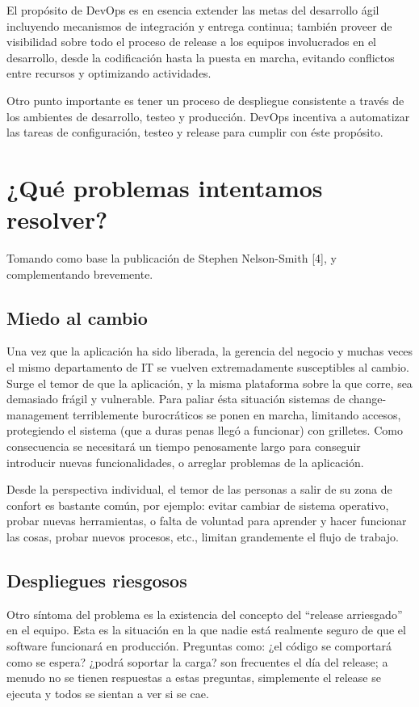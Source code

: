 \documentclass[conference]{IEEEtran}
\begin{document}
El propósito de DevOps es en esencia extender las metas del desarrollo ágil incluyendo mecanismos de integración y entrega continua; también proveer de visibilidad sobre todo el proceso de release a los equipos involucrados en el desarrollo, desde la codificación hasta la puesta en marcha, evitando conflictos entre recursos y optimizando actividades. 

Otro punto importante es tener un proceso de despliegue consistente a través de los ambientes de desarrollo, testeo y producción. DevOps incentiva a automatizar las tareas de configuración, testeo y release para cumplir con éste propósito.

\section{¿Qué problemas intentamos resolver?}
Tomando como base la publicación de Stephen Nelson-Smith [4], y complementando brevemente.

\subsection{Miedo al cambio}

Una vez que la aplicación ha sido liberada, la gerencia del negocio y muchas veces el mismo departamento de IT se vuelven extremadamente susceptibles al cambio. Surge el temor de que la aplicación, y la misma plataforma sobre la que corre, sea demasiado frágil y vulnerable. Para paliar ésta situación sistemas de change-management terriblemente burocráticos se ponen en marcha, limitando accesos, protegiendo el sistema (que a duras penas llegó a funcionar) con grilletes. Como consecuencia se necesitará un tiempo penosamente largo para conseguir introducir nuevas funcionalidades, o arreglar problemas de la aplicación.

Desde la perspectiva individual, el temor de las personas a salir de su zona de confort es bastante común, por ejemplo: evitar cambiar de sistema operativo, probar nuevas herramientas, o falta de voluntad para aprender y hacer funcionar las cosas, probar nuevos procesos, etc., limitan grandemente el flujo de trabajo.

\subsection{Despliegues riesgosos}

Otro síntoma del problema es la existencia del concepto del “release arriesgado” en el equipo. Esta es la situación en la que nadie está realmente seguro de que el software funcionará en producción. Preguntas como: ¿el código se comportará como se espera? ¿podrá soportar la carga? son frecuentes el día del release; a menudo no se tienen respuestas a estas preguntas, simplemente el release se ejecuta y todos se sientan a ver si se cae.
\end{document}
